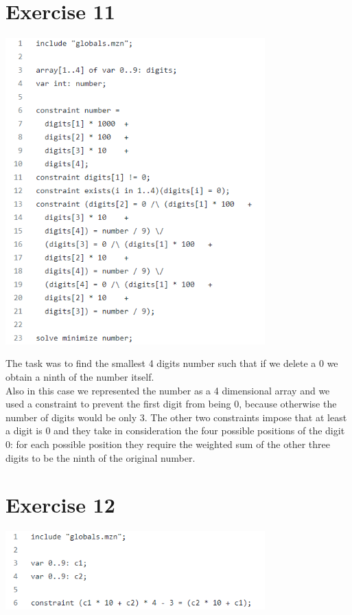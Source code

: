 \documentclass{article}
\begin{document}
\section{Exercise 11}
\vspace{0.2cm}
\includegraphics[width=10cm]{img/Es11.png}
\vspace{0.2cm}

The task was to find the smallest 4 digits number such that if we delete a 0 we obtain a ninth of the number itself. \\
Also in this case we represented the number as a 4 dimensional array and we used a constraint to prevent the first digit from being 0, because otherwise the number of digits would be only 3. The other two constraints impose that at least a digit is 0 and they take in consideration the four possible positions of the digit 0: for each possible position they require the weighted sum of the other three digits to be the ninth of the original number.

\section{Exercise 12}
\vspace{0.2cm}
\includegraphics[width=10cm]{img/Es12.png}
\vspace{0.2cm}
\end{document}

